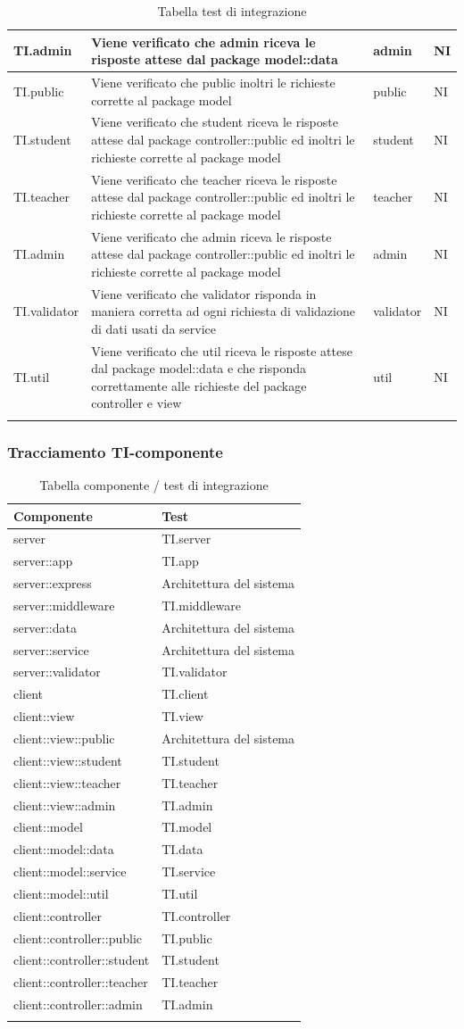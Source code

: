 \documentclass[12pt,a4paper]{article}
\begin{document}
\begin{longtable}{l p{8cm} l l}
		\midrule
		TI.admin & Viene verificato che admin riceva le risposte attese dal package model::data & admin & NI\tabularnewline
		\midrule
		TI.public & Viene verificato che public inoltri le richieste corrette al package model & public & NI\tabularnewline
		\midrule
		TI.student & Viene verificato che student riceva le risposte attese dal package controller::public ed inoltri le richieste corrette al package model & student & NI\tabularnewline
		\midrule
		TI.teacher & Viene verificato che teacher riceva le risposte attese dal package controller::public ed inoltri le richieste corrette al package model & teacher & NI\tabularnewline
		\midrule
		TI.admin & Viene verificato che admin riceva le risposte attese dal package controller::public ed inoltri le richieste corrette al package model & admin & NI\tabularnewline
		\midrule
		TI.validator & Viene verificato che validator risponda in maniera corretta ad ogni richiesta di validazione di dati usati da service & validator & NI\tabularnewline
		\midrule
		TI.util & Viene verificato che util riceva le risposte attese dal package model::data e che risponda correttamente alle richieste del package controller e view & util & NI\tabularnewline
		\midrule
		\caption{Tabella test di integrazione} \tabularnewline
	\end{longtable}
	\subsubsection{Tracciamento TI-componente}
	\begin{longtable}{l l}
		\midrule
		Componente & Test\tabularnewline
		\midrule
		\midrule
		server & TI.server\tabularnewline
		\midrule
		server::app & TI.app\tabularnewline
		\midrule
		server::express & Architettura del sistema\tabularnewline
		\midrule
		server::middleware & TI.middleware\tabularnewline
		\midrule
		server::data & Architettura del sistema\tabularnewline
		\midrule
		server::service & Architettura del sistema\tabularnewline
		\midrule
		server::validator & TI.validator\tabularnewline
		\midrule
		client & TI.client\tabularnewline
		\midrule
		client::view & TI.view\tabularnewline
		\midrule
		client::view::public & Architettura del sistema\tabularnewline
		\midrule
		client::view::student & TI.student\tabularnewline
		\midrule
		client::view::teacher & TI.teacher\tabularnewline
		\midrule
		client::view::admin & TI.admin\tabularnewline
		\midrule
		client::model & TI.model\tabularnewline
		\midrule
		client::model::data & TI.data\tabularnewline
		\midrule
		client::model::service & TI.service\tabularnewline
		\midrule
		client::model::util & TI.util\tabularnewline
		\midrule
		client::controller & TI.controller\tabularnewline
		\midrule
		client::controller::public & TI.public\tabularnewline
		\midrule
		client::controller::student & TI.student\tabularnewline
		\midrule
		client::controller::teacher & TI.teacher\tabularnewline
		\midrule
		client::controller::admin & TI.admin\tabularnewline
		\midrule
		\caption{Tabella componente / test di integrazione} \tabularnewline
	\end{longtable}
	
\end{document}
